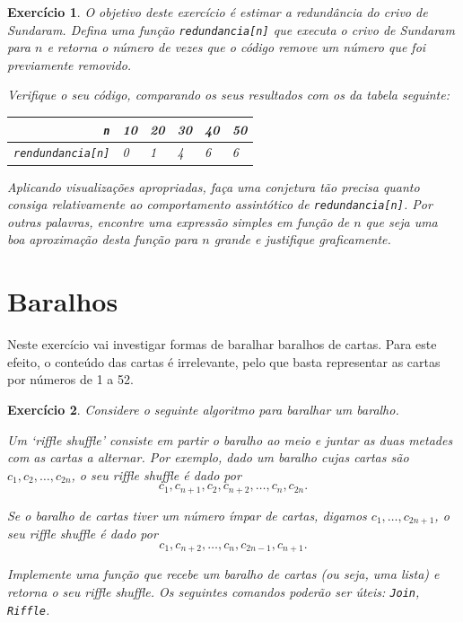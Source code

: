 \documentclass{article}
\newtheorem{ex}{Exercício}[section]
\begin{document}
\begin{ex}
O objetivo deste exercício é estimar a redundância do crivo de Sundaram. Defina uma função \texttt{redundancia[n]} que executa o crivo de Sundaram para $n$ e retorna o número de vezes que o código remove um número que foi previamente removido.

Verifique o seu código, comparando os seus resultados com os da tabela seguinte:


\begin{center}
\begin{tabular}{r|lllll}
\texttt{n} & 10 & 20 & 30 & 40 & 50 \\
\hline
\texttt{rendundancia[n]} & 0 & 1 & 4 & 6 & 6 \\
\end{tabular}
\end{center}

Aplicando visualizações apropriadas, faça uma conjetura tão precisa quanto consiga relativamente ao comportamento assintótico de \texttt{redundancia[n]}. Por outras palavras, encontre uma expressão simples em função de $n$ que seja uma boa aproximação desta função para $n$ grande e justifique graficamente.
\end{ex}

\section{Baralhos}

Neste exercício vai investigar formas de baralhar baralhos de cartas. Para este efeito, o conteúdo das cartas é irrelevante, pelo que basta representar as cartas por números de 1 a 52.

\begin{ex}
Considere o seguinte algoritmo para baralhar um baralho.

Um `riffle shuffle' consiste em partir o baralho ao meio e juntar as duas metades com as cartas a alternar. Por exemplo, dado um baralho cujas cartas são $c_1, c_2, \dots, c_{2n}$, o seu riffle shuffle é dado por
\[c_1, c_{n+1}, c_2, c_{n+2}, \dots, c_n, c_{2n}.\]

Se o baralho de cartas tiver um número ímpar de cartas, digamos $c_1, \dots, c_{2n+1}$, o seu riffle shuffle é dado por
\[c_1, c_{n+2}, \dots, c_n, c_{2n-1}, c_{n+1}.\]

Implemente uma função que recebe um baralho de cartas (ou seja, uma lista) e retorna o seu riffle shuffle. Os seguintes comandos poderão ser úteis: \texttt{Join}, \texttt{Riffle}.
\end{ex}
\end{document}
